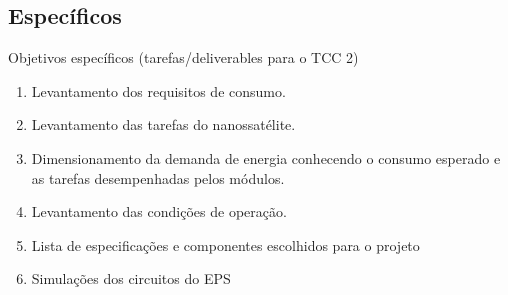 \subsection{Específicos}\label{especificos}
Objetivos específicos (tarefas/deliverables para o TCC 2)
\begin{enumerate}
    \item Levantamento dos requisitos de consumo.
    \item Levantamento das tarefas do nanossatélite.
    \item Dimensionamento da demanda de energia conhecendo o consumo esperado e as tarefas desempenhadas pelos módulos.
    \item Levantamento das condições de operação.
    \item Lista de especificações e componentes escolhidos para o projeto
    \item Simulações dos circuitos do EPS
\end{enumerate}


